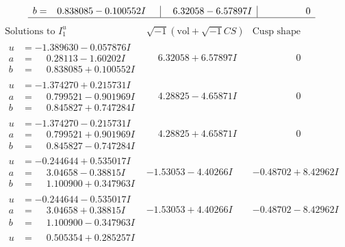 \documentclass[1p]{elsarticle_modified}
\theoremstyle{definition}
\newcommand{\I}{\sqrt{-1}}
\begin{document}
$$\begin{array}{c|c|c}
\begin{aligned}
b &= \phantom{-}0.838085 - 0.100552 I\end{aligned}
 & \phantom{-}6.32058 - 6.57897 I & \phantom{-0.000000 } 0\\
 \hline 
 \end{array}$$\newpage$$\begin{array}{c|c|c}  
\text{Solutions to }I^u_{1}& \I (\text{vol} + \sqrt{-1}CS) & \text{Cusp shape}\\
 \hline 
\begin{aligned}
u &= -1.389630 - 0.057876 I \\
a &= \phantom{-}0.28113 - 1.60202 I \\
b &= \phantom{-}0.838085 + 0.100552 I\end{aligned}
 & \phantom{-}6.32058 + 6.57897 I & \phantom{-0.000000 } 0 \\ \hline\begin{aligned}
u &= -1.374270 + 0.215731 I \\
a &= \phantom{-}0.799521 - 0.901969 I \\
b &= \phantom{-}0.845827 + 0.747284 I\end{aligned}
 & \phantom{-}4.28825 - 4.65871 I & \phantom{-0.000000 } 0 \\ \hline\begin{aligned}
u &= -1.374270 - 0.215731 I \\
a &= \phantom{-}0.799521 + 0.901969 I \\
b &= \phantom{-}0.845827 - 0.747284 I\end{aligned}
 & \phantom{-}4.28825 + 4.65871 I & \phantom{-0.000000 } 0 \\ \hline\begin{aligned}
u &= -0.244644 + 0.535017 I \\
a &= \phantom{-}3.04658 - 0.38815 I \\
b &= \phantom{-}1.100900 + 0.347963 I\end{aligned}
 & -1.53053 - 4.40266 I & -0.48702 + 8.42962 I \\ \hline\begin{aligned}
u &= -0.244644 - 0.535017 I \\
a &= \phantom{-}3.04658 + 0.38815 I \\
b &= \phantom{-}1.100900 - 0.347963 I\end{aligned}
 & -1.53053 + 4.40266 I & -0.48702 - 8.42962 I \\ \hline\begin{aligned}
u &= \phantom{-}0.505354 + 0.285257 I \\

\end{aligned}
\end{array}$$
\end{document}
